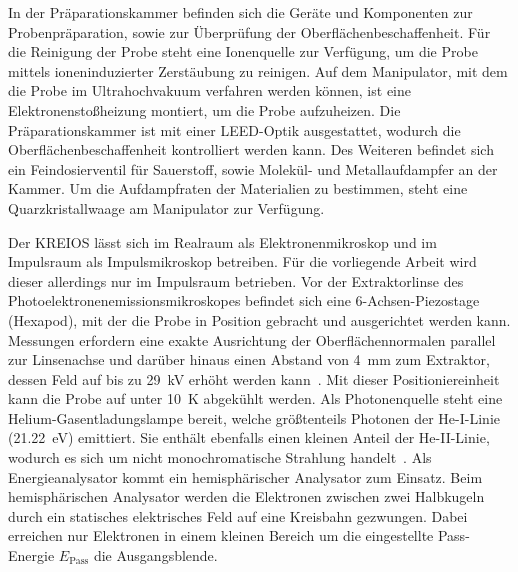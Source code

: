        In der Präparationskammer befinden sich die Geräte und Komponenten zur Probenpräparation, sowie zur Überprüfung der Oberflächenbeschaffenheit.
        Für die Reinigung der Probe steht eine Ionenquelle zur Verfügung, um die Probe mittels ioneninduzierter Zerstäubung zu reinigen.
        Auf dem Manipulator, mit dem die Probe im Ultrahochvakuum verfahren werden können, ist eine Elektronenstoßheizung montiert, um die Probe aufzuheizen.
        Die Präparationskammer ist mit einer LEED-Optik ausgestattet, wodurch die Oberflächenbeschaffenheit kontrolliert werden kann.
        Des Weiteren befindet sich ein Feindosierventil für Sauerstoff, sowie Molekül- und Metallaufdampfer an der Kammer.
        Um die Aufdampfraten der Materialien zu bestimmen, steht eine Quarzkristallwaage am Manipulator zur Verfügung.

        Der KREIOS lässt sich im Realraum als Elektronenmikroskop und im Impulsraum als Impulsmikroskop betreiben.
        Für die vorliegende Arbeit wird dieser allerdings nur im Impulsraum betrieben.
        Vor der Extraktorlinse des Photoelektronenemissionsmikroskopes befindet sich eine 6-Achsen-Piezostage (Hexapod), mit der die Probe in Position gebracht und ausgerichtet werden kann.
        Messungen erfordern eine exakte Ausrichtung der Oberflächennormalen parallel zur Linsenachse und darüber hinaus einen Abstand von \SI{4}{\milli\meter} zum Extraktor, dessen Feld auf bis zu \SI{29}{\kilo\volt} erhöht werden kann~\cite{SPECS-MM}.
        Mit dieser Positioniereinheit kann die Probe auf unter \SI{10}{\kelvin} abgekühlt werden.
        Als Photonenquelle steht eine Helium-Gasentladungslampe bereit, welche größtenteils Photonen der He-I-Linie (\SI{21.22}{\electronvolt}) emittiert.
        Sie enthält ebenfalls einen kleinen Anteil der He-II-Linie, wodurch es sich um nicht monochromatische Strahlung handelt~\cite{UVS}.
        Als Energieanalysator kommt ein hemisphärischer Analysator zum Einsatz.
        Beim hemisphärischen Analysator werden die Elektronen zwischen zwei Halbkugeln durch ein statisches elektrisches Feld auf eine Kreisbahn gezwungen.
        Dabei erreichen nur Elektronen in einem kleinen Bereich um die eingestellte Pass-Energie $E_\text{Pass}$ die Ausgangsblende.
